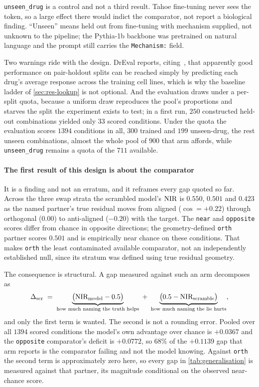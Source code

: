\texttt{unseen\_drug} is a control and not a third result. Tahoe fine-tuning
never sees the token, so a large effect there would indict the comparator, not
report a biological finding. ``Unseen'' means held out from fine-tuning with
mechanism supplied, not unknown to the pipeline; the Pythia-1b backbone was
pretrained on natural language and the prompt still carries the
\texttt{Mechanism:} field.

Two warnings ride with the design. DrEval reports, citing~\cite{partin}, that
apparently good performance on pair-holdout splits can be reached simply by
predicting each drug's average response across the training cell lines, which is
why the baseline ladder of \cref{sec:res-lookup} is not optional. And the
evaluation draws under a per-split quota, because a uniform draw reproduces the
pool's proportions and starves the split the experiment exists to test; in a
first run,
$\num{250}$ constructed held-out combinations yielded only $\num{33}$ scored
conditions. Under the quota the evaluation scores $\num{1394}$ conditions in all,
$\num{300}$ trained and $\num{199}$ unseen-drug, the rest unseen combinations,
almost the whole pool of $\num{900}$ that arm affords, while
\texttt{unseen\_drug} remains a quota of the $\num{711}$ available.

\paragraph{The first result of this design is about the comparator} It is a
finding and not an erratum, and it reframes every gap quoted so far. Across the
three swap strata the scrambled model's $\textrm{NIR}$ is $0.550$, $0.501$ and $0.423$ as
the named partner's true residual moves from aligned ($\cos = +0.22$) through
orthogonal ($0.00$) to anti-aligned ($-0.20$) with the target. The
\texttt{near} and \texttt{opposite} scores differ from chance in opposite
directions; the geometry-defined \texttt{orth} partner scores $0.501$ and is
empirically near chance on these conditions. That makes \texttt{orth} the least
contaminated available comparator, not an independently established null, since
its stratum was defined using true residual geometry.

The consequence is structural. A gap measured against such an arm decomposes as
\begin{equation}
 \Delta_{\textrm{scr}} \;=\; \underbrace{\big(\textrm{NIR}_{\textrm{model}} - 0.5\big)}_{\textrm{how much naming the truth helps}}
 \;+\; \underbrace{\big(0.5 - \textrm{NIR}_{\textrm{scramble}}\big)}_{\textrm{how much naming the lie hurts}},
\end{equation}
and only the first term is wanted. The second is not a rounding error. Pooled
over all $\num{1394}$ scored conditions the model's own advantage over chance is
$+0.0367$ and the \texttt{opposite} comparator's deficit is $+0.0772$, so $68\%$
of the $+0.1139$ gap that arm reports is the comparator failing and not the model
knowing. Against \texttt{orth} the second term is approximately zero here, so
every gap in \cref{tab:generalisation} is measured against that partner, its
magnitude conditional on the observed near-chance score.

